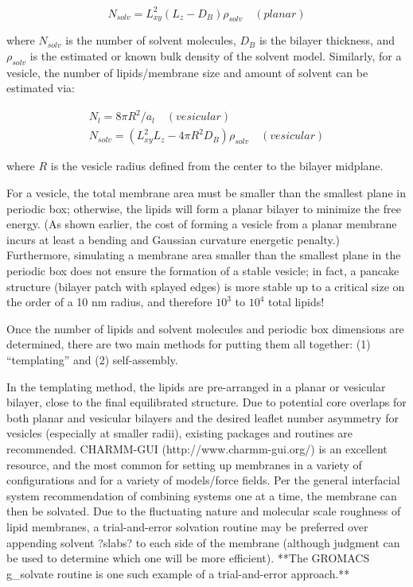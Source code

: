 \documentclass[9pt,bestpractices]{livecoms}
\begin{document}
\begin{equation}
	\label{e:partition}
	N_{solv} = L_{xy}^2 (L_z - D_B) \rho_{solv} \quad (planar)
\end{equation}

where $N_{solv}$ is the number of solvent molecules, $D_B$ is the bilayer thickness, and $\rho_{solv}$ is the estimated or known bulk density of the solvent model. Similarly, for a vesicle, the number of lipids/membrane size and amount of solvent can be estimated via:

\begin{subequations}
\begin{align}
N_l = 8 \pi R^2/a_l \quad (vesicular) \\
N_{solv} = (L_{xy}^2 L_z - 4\pi R^2 D_B) \rho_{solv} \quad (vesicular)
\end{align}
\end{subequations}

where $R$ is the vesicle radius defined from the center to the bilayer midplane.

For a vesicle, the total membrane area must be smaller than the smallest plane in periodic box; otherwise, the lipids will form a planar bilayer to minimize the free energy.
(As shown earlier, the cost of forming a vesicle from a planar membrane incurs at least a bending and Gaussian curvature energetic penalty.)
Furthermore, simulating a membrane area smaller than the smallest plane in the periodic box does not ensure the formation of a stable vesicle; in fact, a pancake structure (bilayer patch with splayed edges) is more stable up to a critical size on the order of a 10 nm radius, and therefore $10^3$ to $10^4$  total lipids! 

Once the number of lipids and solvent molecules and periodic box dimensions are determined, there are two main methods for putting them all together: (1) ``templating'' and (2) self-assembly.

In the templating method, the lipids are pre-arranged in a planar or vesicular bilayer, close to the final equilibrated structure.
Due to potential core overlaps for both planar and vesicular bilayers and the desired leaflet number asymmetry for vesicles (especially at smaller radii), existing packages and routines are recommended.
CHARMM-GUI (http://www.charmm-gui.org/) is an excellent resource, and the most common for setting up membranes in a variety of configurations and for a variety of models/force fields.
Per the general interfacial system recommendation of combining systems one at a time, the membrane can then be solvated.
Due to the fluctuating nature and molecular scale roughness of lipid membranes, a trial-and-error solvation routine may be preferred over appending solvent ?slabs? to each side of the membrane (although judgment can be used to determine which one will be more efficient).
**The GROMACS g\_solvate routine is one such example of a trial-and-error approach.**
\end{document}
